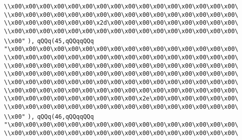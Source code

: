 \verb|\\x00\x00\x00\x00\x00\x00\x00\x00\x00\x00\x00\x00\x00\x00\x00\x00\|\newline
\verb|\\x00\x00\x00\x00\x00\x00\x00\x00\x00\x00\x00\x00\x00\x00\x00\x00\|\newline
\verb|\\x00\x00\x00\x00\x00\x00\x2d\x00\x00\x00\x00\x00\x00\x00\x00\x00\|\newline
\verb|\\x00\x00\x00\x00\x00\x00\x00\x00\x00\x00\x00\x00\x00\x00\x00\x00\|\newline
\verb|\\x00"|\newline
\verb|),|\newline
\verb|qQQq(45,qQQqqQQq|\newline
\verb|"\x00\x00\x00\x00\x00\x00\x00\x00\x00\x00\x00\x00\x00\x00\x00\x00\|\newline
\verb|\\x00\x00\x00\x00\x00\x00\x00\x00\x00\x00\x00\x00\x00\x00\x00\x00\|\newline
\verb|\\x00\x00\x00\x00\x00\x00\x00\x00\x00\x00\x00\x00\x00\x00\x00\x00\|\newline
\verb|\\x00\x00\x00\x00\x00\x00\x00\x00\x00\x00\x00\x00\x00\x00\x00\x00\|\newline
\verb|\\x00\x00\x00\x00\x00\x00\x00\x00\x00\x00\x00\x00\x00\x00\x00\x00\|\newline
\verb|\\x00\x00\x00\x00\x00\x00\x00\x00\x00\x00\x00\x00\x00\x00\x00\x00\|\newline
\verb|\\x00\x00\x00\x00\x00\x00\x00\x00\x00\x2e\x00\x00\x00\x00\x00\x00\|\newline
\verb|\\x00\x00\x00\x00\x00\x00\x00\x00\x00\x00\x00\x00\x00\x00\x00\x00\|\newline
\verb|\\x00"|\newline
\verb|),|\newline
\verb|qQQq(46,qQQqqQQq|\newline
\verb|"\x00\x00\x00\x00\x00\x00\x00\x00\x00\x00\x00\x00\x00\x00\x00\x00\|\newline
\verb|\\x00\x00\x00\x00\x00\x00\x00\x00\x00\x00\x00\x00\x00\x00\x00\x00\|\newline
